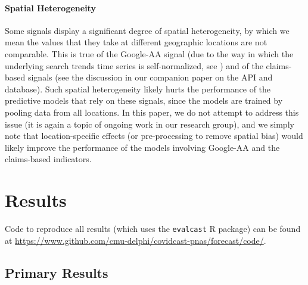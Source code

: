\documentclass[9pt,twocolumn,twoside,lineno]{pnas-new}
\begin{document}
\paragraph{Spatial Heterogeneity} 

Some signals display a significant degree of spatial heterogeneity, by which we
mean the values that they take at different geographic locations are not 
comparable.  This is true of the Google-AA signal (due to the way in which the 
underlying search trends time series is self-normalized, see
\cite{GoogleSymptoms}) and of the claims-based signals (see the discussion in
our companion paper on the API and database).  Such spatial heterogeneity likely
hurts the performance of the predictive models that rely on these signals,
since the models are trained by pooling data from all locations.  In this paper,
we do not attempt to address this issue (it is again a topic of ongoing work in
our research group), and we simply note that location-specific effects (or 
pre-processing to remove spatial bias) would likely improve the performance of
the models involving Google-AA and the claims-based indicators.

\section{Results}

Code to reproduce all results (which uses the \texttt{evalcast} R package) can 
be found at
\url{https://www.github.com/cmu-delphi/covidcast-pnas/forecast/code/}. 

\subsection{Primary Results}
\end{document}
